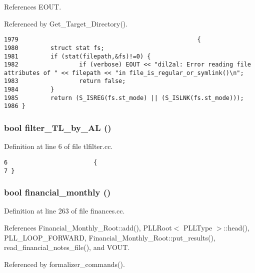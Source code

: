 References EOUT.

Referenced by Get\_\-Target\_\-Directory().



\footnotesize\begin{verbatim}1979                                                  {
1980         struct stat fs;
1981         if (stat(filepath,&fs)!=0) {
1982                 if (verbose) EOUT << "dil2al: Error reading file attributes of " << filepath << "in file_is_regular_or_symlink()\n";
1983                 return false;
1984         }
1985         return (S_ISREG(fs.st_mode) || (S_ISLNK(fs.st_mode)));
1986 }
\end{verbatim}\normalsize 
{}
\subsubsection{\setlength{\rightskip}{0pt plus 5cm}bool filter\_\-TL\_\-by\_\-AL ()}\label{dil2al_8hh_a342}




Definition at line 6 of file tlfilter.cc.



\footnotesize\begin{verbatim}6                        {
7 }
\end{verbatim}\normalsize 
{}
\subsubsection{\setlength{\rightskip}{0pt plus 5cm}bool financial\_\-monthly ()}\label{dil2al_8hh_a370}




Definition at line 263 of file finances.cc.

References Financial\_\-Monthly\_\-Root::add(), PLLRoot$<$ PLLType $>$::head(), PLL\_\-LOOP\_\-FORWARD, Financial\_\-Monthly\_\-Root::put\_\-results(), read\_\-financial\_\-notes\_\-file(), and VOUT.

Referenced by formalizer\_\-commands().



